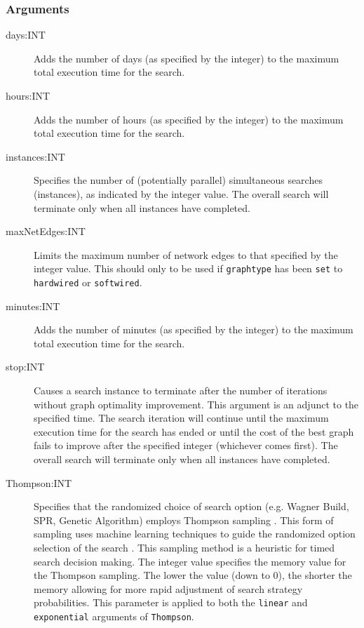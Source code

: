 	\subsubsection{Arguments}
	\begin{description}
	
		\item[days:INT] Adds the number of days (as specified by the integer) to the 
		maximum total execution time for the search.
		
		\item[hours:INT] Adds the number of hours (as specified by the integer) to the 
		maximum total execution time for the search.
		
		\item[instances:INT] Specifies the number of (potentially parallel) simultaneous
		searches (instances), as indicated by the integer value. The overall search will 
		terminate only when all instances have completed.
		
		\item[maxNetEdges:INT] Limits the maximum number of network edges to that
		specified by the integer value. This should only to be used if \texttt{graphtype}
		has been \texttt{set} to \texttt{hardwired} or \texttt{softwired}. 
		
		\item[minutes:INT] Adds the number of minutes (as specified by the integer) to 
		the maximum total execution time for the search.
		
		

		\item[stop:INT] Causes a search instance to terminate after the number of iterations 
		without graph optimality improvement. This argument is an adjunct to the specified 
		time. The search iteration will continue until the maximum execution time for the search 
		has ended or until the cost of the best graph fails to improve after the specified integer 
		(whichever comes first). The overall search will terminate only when all instances have 
		completed.
		
		\item[Thompson:INT] Specifies that the randomized choice of search option (e.g. 
		Wagner Build, SPR, Genetic Algorithm) employs Thompson sampling \citep{Thompson1933}. 
		This form of sampling uses machine learning techniques to guide the randomized option 
		selection of the search \citep{WheelerThompson}. This sampling method is a heuristic for 
		timed search decision making. The integer value specifies the memory value for the Thompson 
		sampling. The lower the value (down to 0), the shorter the memory allowing for more rapid 
		adjustment of search strategy probabilities. This parameter is applied to both the \texttt{linear} 
		and \texttt{exponential} arguments of \texttt{Thompson}.
			

\end{description}
